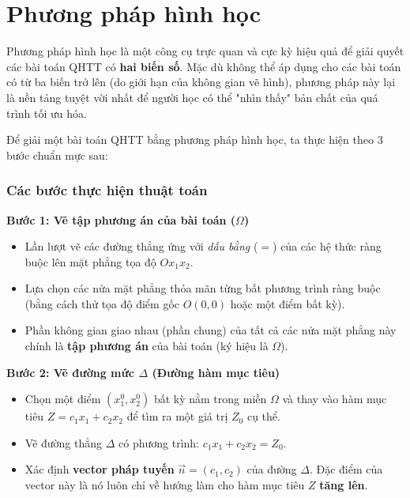 \section{Phương pháp hình học}

Phương pháp hình học là một công cụ trực quan và cực kỳ hiệu quả để giải quyết các bài toán QHTT có \textbf{hai biến số}. Mặc dù không thể áp dụng cho các bài toán có từ ba biến trở lên (do giới hạn của không gian vẽ hình), phương pháp này lại là nền tảng tuyệt vời nhất để người học có thể "nhìn thấy" bản chất của quá trình tối ưu hóa.

Để giải một bài toán QHTT bằng phương pháp hình học, ta thực hiện theo 3 bước chuẩn mực sau:

\subsubsection{Các bước thực hiện thuật toán}

\textbf{Bước 1: Vẽ tập phương án của bài toán ($\Omega$)}
\begin{itemize}
    \item Lần lượt vẽ các đường thẳng ứng với \textit{dấu bằng} ($=$) của các hệ thức ràng buộc lên mặt phẳng tọa độ $Ox_1x_2$.
    \item Lựa chọn các nửa mặt phẳng thỏa mãn từng bất phương trình ràng buộc (bằng cách thử tọa độ điểm gốc $O(0,0)$ hoặc một điểm bất kỳ).
    \item Phần không gian giao nhau (phần chung) của tất cả các nửa mặt phẳng này chính là \textbf{tập phương án} của bài toán (ký hiệu là $\Omega$).
\end{itemize}

\textbf{Bước 2: Vẽ đường mức $\Delta$ (Đường hàm mục tiêu)}
\begin{itemize}
    \item Chọn một điểm $(x_1^0, x_2^0)$ bất kỳ nằm trong miền $\Omega$ và thay vào hàm mục tiêu $Z = c_1x_1 + c_2x_2$ để tìm ra một giá trị $Z_0$ cụ thể.
    \item Vẽ đường thẳng $\Delta$ có phương trình: $c_1x_1 + c_2x_2 = Z_0$.
    \item Xác định \textbf{vector pháp tuyến} $\vec{n} = (c_1, c_2)$ của đường $\Delta$. Đặc điểm của vector này là nó luôn chỉ về hướng làm cho hàm mục tiêu $Z$ \textbf{tăng lên}.
\end{itemize}

